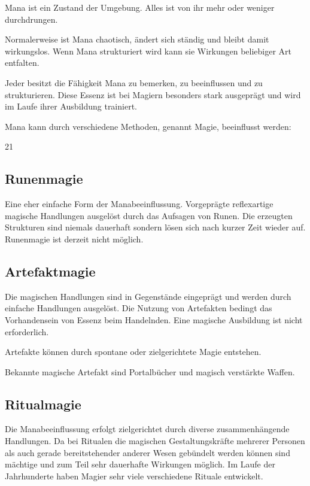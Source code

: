 \documentclass[a4paper,11pt]{book}
\begin{document}
Mana ist ein Zustand der Umgebung. Alles ist von ihr mehr oder weniger durchdrungen.

Normalerweise ist Mana chaotisch, ändert sich ständig und bleibt damit wirkungslos. Wenn Mana strukturiert wird kann sie Wirkungen beliebiger Art entfalten.

Jeder besitzt die Fähigkeit Mana zu bemerken, zu beeinflussen und zu strukturieren. Diese Essenz ist bei Magiern besonders stark ausgeprägt und wird im Laufe ihrer Ausbildung trainiert.

Mana kann durch verschiedene Methoden, genannt Magie, beeinflusst werden:

21

\subsection{Runenmagie}

Eine eher einfache Form der Manabeeinflussung. Vorgeprägte reflexartige magische Handlungen ausgelöst durch das Aufsagen von Runen. Die erzeugten Strukturen sind niemals dauerhaft sondern lösen sich nach kurzer Zeit wieder auf. Runenmagie ist derzeit nicht möglich.

\subsection{Artefaktmagie}

Die magischen Handlungen sind in Gegenstände eingeprägt und werden durch einfache Handlungen ausgelöst. Die Nutzung von Artefakten bedingt das Vorhandensein von Essenz beim Handelnden. Eine magische Ausbildung ist nicht erforderlich.

Artefakte können durch spontane oder zielgerichtete Magie entstehen.

Bekannte magische Artefakt sind Portalbücher und magisch verstärkte Waffen.

\subsection{Ritualmagie}

Die Manabeeinflussung erfolgt zielgerichtet durch diverse zusammenhängende Handlungen. Da bei Ritualen die magischen Gestaltungskräfte mehrerer Personen als auch gerade bereitstehender anderer Wesen gebündelt werden können sind mächtige und zum Teil sehr dauerhafte Wirkungen möglich. Im Laufe der Jahrhunderte haben Magier sehr viele verschiedene Rituale entwickelt.
\end{document}
